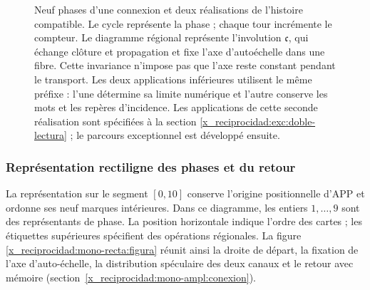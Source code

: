 \begin{figure}[p]
\caption{Neuf phases d'une connexion et deux réalisations de l'histoire
compatible. Le cycle représente la phase ; chaque tour incrémente le compteur.
Le diagramme régional représente l'involution \(\mathfrak c\), qui
échange clôture et propagation et fixe l'axe d'autoéchelle dans une fibre.
Cette invariance n'impose pas que l'axe reste constant pendant le transport.
Les deux applications inférieures utilisent le même préfixe : l'une détermine
sa limite numérique et l'autre conserve les mots et les repères d'incidence. Les
applications de cette seconde réalisation sont spécifiées à la section
\ref{x_reciprocidad:exc:doble-lectura} ; le parcours exceptionnel est développé ensuite.}
\label{x_reciprocidad:mono-ampl:fig-regional}
\end{figure}




\clearpage
\subsubsection{Représentation rectiligne des phases et du retour}
\label{x_reciprocidad:mono-recta:desarrollo}

La représentation sur le segment \([0,10]\) conserve l'origine positionnelle d'APP et ordonne ses neuf marques intérieures. Dans ce diagramme, les entiers \(1,\ldots,9\) sont des représentants de phase. La position horizontale indique l'ordre des cartes ; les étiquettes supérieures spécifient des opérations régionales. La figure \ref{x_reciprocidad:mono-recta:figura} réunit ainsi la droite de départ, la fixation de l'axe d'auto-échelle, la distribution spéculaire des deux canaux et le retour avec mémoire (section~\ref{x_reciprocidad:mono-ampl:conexion}).


